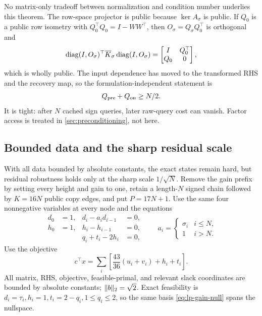 No matrix-only tradeoff between normalization and condition number underlies
this theorem.
The row-space projector is public because \(\ker A_\sigma\) is public.  If
\(Q_0\) is a public row isometry with \(Q_0^\top Q_0=I-WW^\top\), then
\(O_\sigma=Q_\sigma Q_0^\top\) is orthogonal and
\begin{equation}
 \operatorname{diag}(I,O_\sigma)^\top\overline K_\sigma\operatorname{diag}(I,O_\sigma)
 =\begin{bmatrix}I&Q_0^\top\\Q_0&0\end{bmatrix},
\end{equation}
which is wholly public.  The input dependence has moved to the transformed
RHS and the recovery map, so the formulation-independent statement is
\begin{equation}
 Q_{\rm pre}+Q_{\rm on}\geq N/2.
\end{equation}
It is tight: after \(N\) cached sign queries, later raw-query cost can vanish.
Factor access is treated in \cref{sec:preconditioning}, not here.

\subsection{Bounded data and the sharp residual scale}
\label{sec:lp-bounded-data}

With all data bounded by absolute constants, the exact states remain hard,
but residual robustness holds only at the sharp scale \(1/\sqrt N\).  Remove the gain prefix by setting every height and gain to one, retain a
length-\(N\) signed chain followed by \(K=16N\) public copy edges, and put
\(P=17N+1\).  Use the same four nonnegative variables at every node and the
equations
\begin{equation}
\begin{aligned}
 d_0&=1,&d_i-a_id_{i-1}&=0,\\
 h_0&=1,&h_i-h_{i-1}&=0,\\
 &&q_i+t_i-2h_i&=0,
\end{aligned}
\qquad
 a_i=\begin{cases}\sigma_i&i\leq N,\\1&i>N.\end{cases}
\end{equation}
Use the objective
\begin{equation}
 c^\top x=\sum_i\left[\frac{43}{36}(u_i+v_i)+h_i+t_i\right].
\end{equation}
All matrix, RHS, objective, feasible-primal, and relevant slack coordinates
are bounded by absolute constants; \(\lVert b\rVert_2=\sqrt2\).  Exact feasibility
is \(d_i=\tau_i,h_i=1,t_i=2-q_i,1\leq q_i\leq2\), so the same basis
\eqref{eq:lp-gain-null} spans the nullspace.

